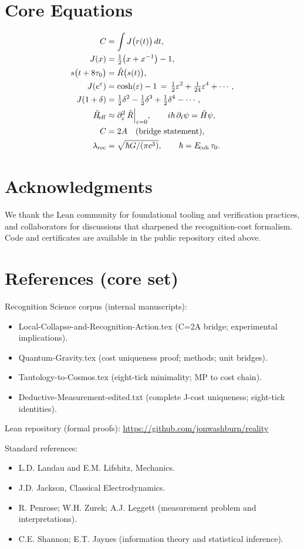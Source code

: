 \documentclass[aps,prx,twocolumn,superscriptaddress,nofootinbib]{revtex4-2}
\newcommand{\Rhat}{\hat{R}}
\newcommand{\Hhat}{\hat{H}}
\newcommand{\Jcost}{J}
\newcommand{\Ccost}{C}
\newcommand{\TauZero}{\tau_{0}}
\begin{document}
\section*{Core Equations}
\begin{align}
  \Ccost &= \int \Jcost\bigl(r(t)\bigr)\,dt, \\
  \Jcost(x) &= \tfrac12\bigl(x+x^{-1}\bigr)-1, \\
  s\bigl(t+8\TauZero\bigr) &= \Rhat\bigl(s(t)\bigr), \\
  \Jcost(e^{\varepsilon}) &= \cosh(\varepsilon)-1 \,=\, \tfrac12\varepsilon^2 + \tfrac1{24}\varepsilon^4 + \cdots, \\
  \Jcost(1+\delta) &= \tfrac12\delta^2 - \tfrac12\delta^3 + \tfrac12\delta^4 - \cdots, \\
  \Hhat_{\!\mathrm{eff}} &\approx \Bigl.\partial_{\varepsilon}^2\,\Rhat\Bigr|_{\varepsilon=0}, \qquad i\hbar\,\partial_t \psi = \Hhat\psi, \\
  \Ccost &= 2A \quad (\text{bridge statement}), \\
  \lambda_{\mathrm{rec}} &= \sqrt{\hbar G/(\pi c^3)}, \qquad \hbar = E_{\!\mathrm{coh}}\,\TauZero.
\end{align}

\section*{Acknowledgments}
We thank the Lean community for foundational tooling and verification practices, and collaborators for discussions that sharpened the recognition-cost formalism. Code and certificates are available in the public repository cited above.

\section*{References (core set)}
\noindent Recognition Science corpus (internal manuscripts):
\begin{itemize}
  \item Local-Collapse-and-Recognition-Action.tex (C=2A bridge; experimental implications).
  \item Quantum-Gravity.tex (cost uniqueness proof; methods; unit bridges).
  \item Tautology-to-Cosmos.tex (eight-tick minimality; MP to cost chain).
  \item Deductive-Measurement-edited.txt (complete J-cost uniqueness; eight-tick identities).
\end{itemize}
\noindent Lean repository (formal proofs): \url{https://github.com/jonwashburn/reality}

\noindent Standard references:
\begin{itemize}
  \item L.D. Landau and E.M. Lifshitz, Mechanics.
  \item J.D. Jackson, Classical Electrodynamics.
  \item R. Penrose; W.H. Zurek; A.J. Leggett (measurement problem and interpretations).
  \item C.E. Shannon; E.T. Jaynes (information theory and statistical inference).
\end{itemize}



\end{document}
